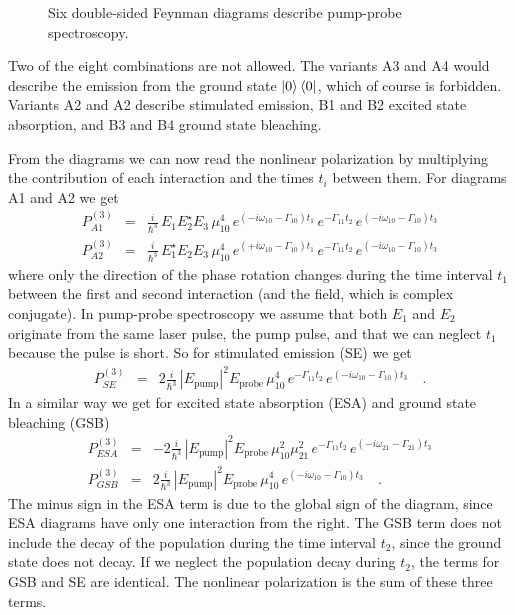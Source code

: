 \begin{figure}
\caption{
Six double-sided Feynman diagrams describe pump-probe spectroscopy.}
\label{fig:2d_feynman_pump_probe}
\end{figure}

Two of the eight combinations are not allowed. The variants A3 and A4 would describe the emission from the ground state $\ket{0} \bra{0}$, which of course is forbidden. Variants A2 and A2 describe stimulated emission, B1 and B2 excited state absorption, and B3 and B4 ground state bleaching.

From the diagrams we can now read the nonlinear polarization by multiplying the contribution of each interaction and the times $t_i$ between them. For diagrams A1 and A2 we get
\begin{eqnarray}
P^{(3)}_{A1} & =& \frac{i}{\hbar^3} \,  E_1 E_2^\star E_3 \, \mu_{10}^4 \,
e^{ (-i \omega_{10} - \Gamma_{10}) t_1 } \,
e^{  - \Gamma_{11} t_2 } \,
e^{ (-i \omega_{10} - \Gamma_{10}) t_3 }  \\
P^{(3)}_{A2} & =& \frac{i}{\hbar^3} \,  E_1^\star E_2 E_3 \, \mu_{10}^4 \,
e^{ (+i \omega_{10} - \Gamma_{10}) t_1 } \,
e^{  - \Gamma_{11} t_2 } \,
e^{ (-i \omega_{10} - \Gamma_{10}) t_3 }  
\end{eqnarray}
where only the direction of the phase rotation changes during the time interval $t_1$ between the first and second interaction (and the field, which is complex conjugate). In pump-probe spectroscopy we assume that both $E_1$ and $E_2$ originate from the same laser pulse, the pump pulse, and that we can neglect $t_1$ because the pulse is short. So for stimulated emission (SE) we get
\begin{eqnarray}
P^{(3)}_{SE} & =& 2 \frac{i}{\hbar^3} \,  | E_\text{pump}|^2 E_\text{probe} \, \mu_{10}^4 \,
e^{  - \Gamma_{11} t_2 } \,
e^{ (-i \omega_{10} - \Gamma_{10}) t_3 } \quad .
\end{eqnarray}
In a similar way we get for excited state absorption (ESA) and ground state bleaching (GSB)
\begin{eqnarray}
P^{(3)}_{ESA} & =& -2 \frac{i}{\hbar^3} \,  | E_\text{pump}|^2 E_\text{probe} \, \mu_{10}^2 \mu_{21}^2 \,
e^{  - \Gamma_{11} t_2 } \,
e^{ (-i \omega_{21} - \Gamma_{21}) t_3 }  \\
P^{(3)}_{GSB}  & =& 2 \frac{i}{\hbar^3} \,  | E_\text{pump}|^2 E_\text{probe} \, \mu_{10}^4 \,
e^{ (-i \omega_{10} - \Gamma_{10}) t_3 }  \quad .
\end{eqnarray}
The minus sign in the ESA term is due to the global sign of the diagram, since ESA diagrams have only one interaction from the right. The GSB term does not include the decay of the population during the time interval $t_2$, since the ground state does not decay. If we neglect the population decay during $t_2$, the terms for GSB and SE are identical. The nonlinear polarization is the sum of these three terms.

